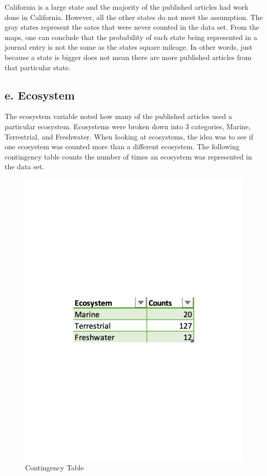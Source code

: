 \documentclass[
]{article}
\begin{document}
California is a large state and the majority of the published articles
had work done in California. However, all the other states do not meet
the assumption. The gray states represent the sates that were never
counted in the data set. From the maps, one can conclude that the
probability of each state being represented in a journal entry is not
the same as the states square mileage. In other words, just because a
state is bigger does not mean there are more published articles from
that particular state.

\hypertarget{e.-ecosystem}{%
\subsection{e. Ecosystem}\label{e.-ecosystem}}

The ecosystem variable noted how many of the published articles used a
particular ecosystem. Ecosystems were broken down into 3 categories,
Marine, Terrestrial, and Freshwater. When looking at ecosystems, the
idea was to see if one ecosystem was counted more than a different
ecosystem. The following contingency table counts the number of times an
ecosystem was represented in the data set.

\begin{figure}
  \caption{Contingency Table}
    \includegraphics[width=13cm]{ct-eco.pdf}
\end{figure}
\end{document}

